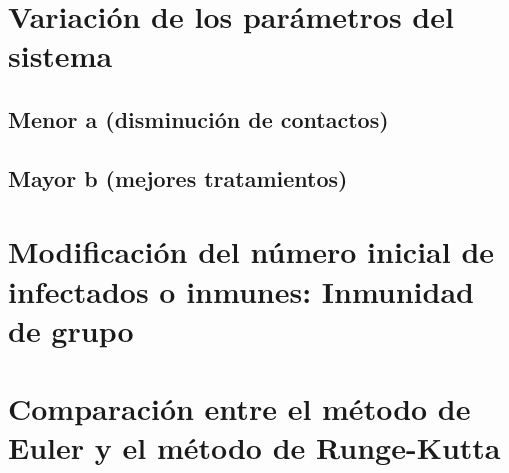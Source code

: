 \documentclass[12pt, spanish]{article}
\begin{document}
\section{Variación de los parámetros del sistema}

\subsection{Menor a (disminución de contactos)}

\subsection{Mayor b (mejores tratamientos)}



\section{Modificación del número inicial de infectados o inmunes: Inmunidad de grupo}

\section{Comparación entre el método de Euler y el método de Runge-Kutta}


%
%
\end{document}

